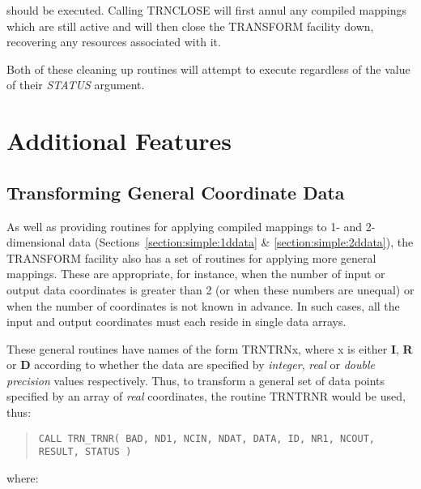\documentclass[twoside,11pt]{article}
\newcommand{\xlabel}[1]{}
\renewcommand{\_}{\texttt{\symbol{95}}}
\newcommand{\name}[1]{\mbox{\small{#1}}}
\newcommand{\fortvar}[1]{\mbox{\emph{#1}}}
\begin{document}
should be executed.
Calling \name{TRN\_CLOSE} will first annul any compiled mappings which are
still active and will then close the \name{TRANSFORM} facility down,
recovering any resources associated with it.

Both of these cleaning up routines will attempt to execute regardless of the
value of their \fortvar{STATUS} argument.


\section{\xlabel{additional_features}Additional Features}

\subsection{\xlabel{transforming_general_coordinate_data}Transforming General Coordinate Data}

\label{section:additional:generaldata}

As well as providing routines for applying compiled mappings to 1- and
2-dimensional data (Sections~\ref{section:simple:1ddata} \&
\ref{section:simple:2ddata}), the \name{TRANSFORM} facility also has a set
of routines for applying more general mappings.
These are appropriate, for instance, when the number of input or output data
coordinates is greater than 2 (or when these numbers are unequal) or when
the number of coordinates is not known in advance.
In such cases, all the input and output coordinates must each reside in
single data arrays.

These general routines have names of the form \name{TRN\_TRNx}, where x is
either \textbf{I}, \textbf{R} or \textbf{D} according to whether the data are
specified by \emph{integer}, \emph{real} or \emph{double precision} values
respectively.
Thus, to transform a general set of data points specified by an array of
{\em real} coordinates, the routine \name{TRN\_TRNR} would be used, thus:

\begin{quote}\small
\begin{verbatim}
CALL TRN_TRNR( BAD, ND1, NCIN, NDAT, DATA, ID, NR1, NCOUT, RESULT, STATUS )
\end{verbatim}
\end{quote}

where:
\end{document}
